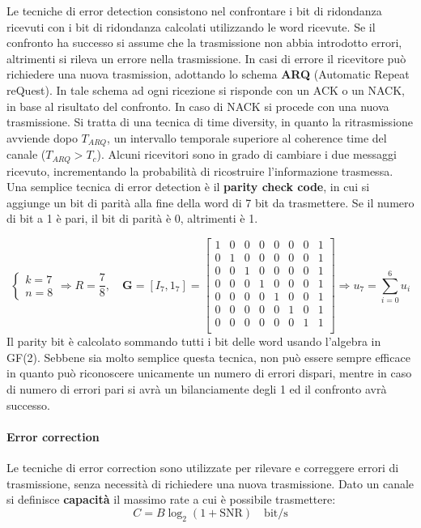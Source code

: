 Le tecniche di error detection consistono nel confrontare i bit di ridondanza ricevuti con i bit di ridondanza calcolati utilizzando le word ricevute. Se il confronto ha successo si assume che la trasmissione non abbia introdotto errori, altrimenti si rileva un errore nella trasmissione.
In casi di errore il ricevitore può richiedere una nuova trasmission, adottando lo schema \textbf{ARQ} (Automatic Repeat reQuest). In tale schema ad ogni ricezione si risponde con un ACK o un NACK, in base al risultato del confronto. In caso di NACK si procede con una nuova trasmissione. 
Si tratta di una tecnica di time diversity, in quanto la ritrasmissione avviende dopo $T_{ARQ}$, un intervallo temporale superiore al coherence time del canale ($T_{ARQ} > T_c$).
Alcuni ricevitori sono in grado di cambiare i due messaggi ricevuto, incrementando la probabilità di ricostruire l'informazione trasmessa.
Una semplice tecnica di error detection è il \textbf{parity check code}, in cui si aggiunge un bit di parità alla fine della word di 7 bit da trasmettere. Se il numero di bit a 1 è pari, il bit di parità è 0, altrimenti è 1.

\[
    \begin{cases}
        k = 7 \\
        n = 8 
    \end{cases}
    \Rightarrow R = \frac{7}{8},
    \quad \mathbf{G} = \left[I_7, 1_7\right] = 
    \begin{bmatrix}
        1 & 0 & 0 & 0 & 0 & 0 & 0 & 1 \\
        0 & 1 & 0 & 0 & 0 & 0 & 0 & 1 \\
        0 & 0 & 1 & 0 & 0 & 0 & 0 & 1 \\
        0 & 0 & 0 & 1 & 0 & 0 & 0 & 1 \\
        0 & 0 & 0 & 0 & 1 & 0 & 0 & 1 \\
        0 & 0 & 0 & 0 & 0 & 1 & 0 & 1 \\
        0 & 0 & 0 & 0 & 0 & 0 & 1 & 1 \\
    \end{bmatrix}
    \Rightarrow u_7 = \sum_{i=0}^{6} u_i
\]
Il parity bit è calcolato sommando tutti i bit delle word usando l'algebra in GF(2).
Sebbene sia molto semplice questa tecnica, non può essere sempre efficace in quanto può riconoscere unicamente un numero di errori dispari, mentre in caso di numero di errori pari si avrà un bilanciamente degli 1 ed il confronto avrà successo.

\paragraph*{Error correction}
Le tecniche di error correction sono utilizzate per rilevare e correggere errori di trasmissione, senza necessità di richiedere una nuova trasmissione.
Dato un canale si definisce \textbf{capacità} il massimo rate a cui è possibile trasmettere:
\[
    C = B \log_2(1 + \text{SNR}) \quad \text{bit/s}
\]

